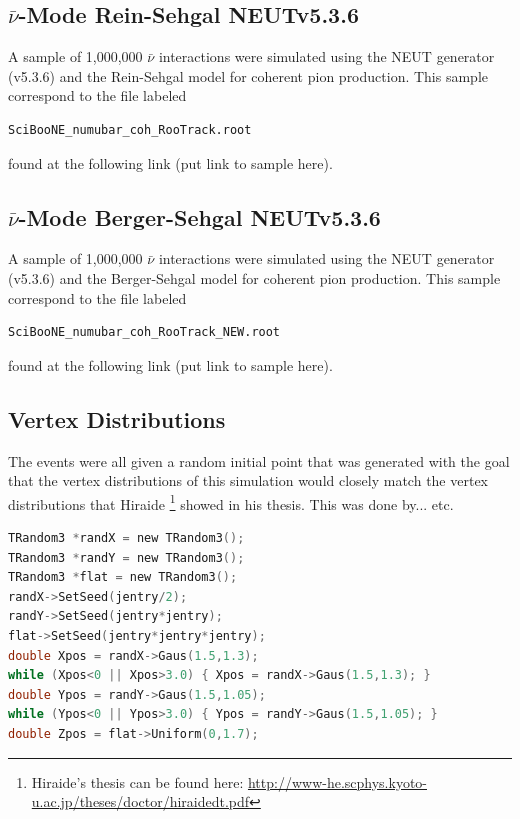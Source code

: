 \documentclass[11pt]{article}
\begin{document}
\subsection{$\bar{\nu}$-Mode Rein-Sehgal NEUTv5.3.6}
A sample of 1,000,000 $\bar{\nu}$ interactions were simulated using the NEUT generator (v5.3.6) and the Rein-Sehgal model for coherent pion production. This sample correspond to the file labeled
\begin{verbatim}
SciBooNE_numubar_coh_RooTrack.root
\end{verbatim}
found at the following link (put link to sample here).

\subsection{$\bar{\nu}$-Mode Berger-Sehgal NEUTv5.3.6}
A sample of 1,000,000 $\bar{\nu}$ interactions were simulated using the NEUT generator (v5.3.6) and the Berger-Sehgal model for coherent pion production. This sample correspond to the file labeled
\begin{verbatim}
SciBooNE_numubar_coh_RooTrack_NEW.root
\end{verbatim}
found at the following link (put link to sample here).




\subsection{Vertex Distributions}
The events were all given a random initial point that was generated with the goal that the vertex distributions of this simulation would closely match the vertex distributions that Hiraide \footnote{Hiraide's thesis can be found here: \href{http://www-he.scphys.kyoto-u.ac.jp/theses/doctor/hiraide_dt.pdf}{http://www-he.scphys.kyoto-u.ac.jp/theses/doctor/hiraide\textunderscore{}dt.pdf}} showed in his thesis. This was done by... etc.

\begin{lstlisting}[language=C]
TRandom3 *randX = new TRandom3();
TRandom3 *randY = new TRandom3();
TRandom3 *flat = new TRandom3();
randX->SetSeed(jentry/2);
randY->SetSeed(jentry*jentry);
flat->SetSeed(jentry*jentry*jentry);
double Xpos = randX->Gaus(1.5,1.3);
while (Xpos<0 || Xpos>3.0) { Xpos = randX->Gaus(1.5,1.3); }
double Ypos = randY->Gaus(1.5,1.05);
while (Ypos<0 || Ypos>3.0) { Ypos = randY->Gaus(1.5,1.05); }
double Zpos = flat->Uniform(0,1.7);
\end{lstlisting}
\end{document}

